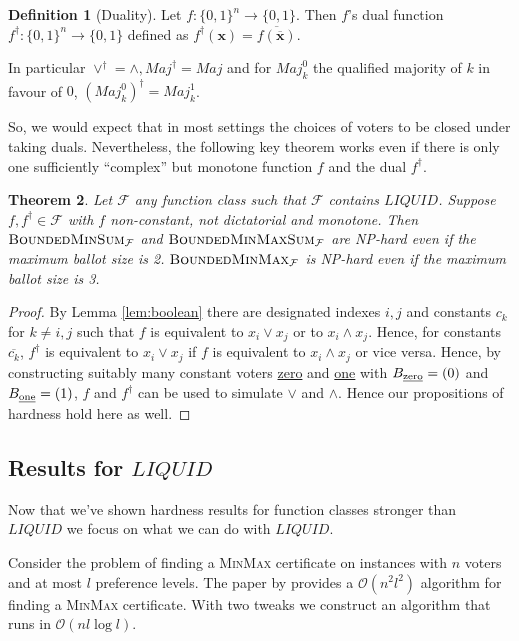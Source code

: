 \documentclass[11pt,a4paper, titlepage]{article}
\newtheorem{theorem}{Theorem}
\theoremstyle{definition}
\newtheorem{definition}[theorem]{Definition}
\let\vec\mathbf
\newcommand{\BMM}{\textsc{BoundedMinMax}}
\newcommand{\BMS}{\textsc{BoundedMinSum}}
\newcommand{\BMMS}{\textsc{BoundedMinMaxSum}}
\newcommand{\Maj}{\mathit{Maj}}
\newcommand{\LIQUID}{\mathit{LIQUID}}
\begin{document}
\begin{definition}[Duality]
    Let $f \colon \{0, 1\}^n \longrightarrow \{0, 1\}$. Then $f$'s dual function $f^\dagger \colon \{0, 1\}^n \longrightarrow \{0, 1\}$ defined as $f^\dagger(\vec{x}) = \overline{f(\overline{\vec{x}})}$.
\end{definition}

In particular $\lor^\dagger = \land,\Maj^\dagger= \Maj$ and for $\Maj_k^0$ the qualified majority of $k$ in favour of $0$, $(\Maj_k^0)^\dagger = \Maj_k^1$.

So, we would expect that in most settings the choices of voters to be closed under taking duals.
Nevertheless, the following key theorem works even if there is only one sufficiently ``complex'' but monotone function $f$ and the dual $f^\dagger$.

\begin{theorem}
    Let $\mathcal{F}$ any function class such that $\mathcal{F}$ contains $\LIQUID$. Suppose $f, f^\dagger \in \mathcal{F}$ with $f$ non-constant, not dictatorial and monotone.
    Then $\BMS_\mathcal{F}$ and $\BMMS_\mathcal{F}$ are NP-hard even if the maximum ballot size is 2. $\BMM_{\mathcal{F}}$ is NP-hard even if the maximum ballot size is 3.
\end{theorem}

\begin{proof}
    By Lemma \ref{lem:boolean} there are designated indexes $i, j$ and constants $c_k$ for $k \neq i, j$ such that $f$ is equivalent to $x_i \lor x_j$ or to $x_i \land x_j$.
    Hence, for constants $\overline{c_k}$, $f^\dagger$ is equivalent to $x_i \lor x_j$ if $f$ is equivalent to $x_i \land x_j$ or vice versa.
    Hence, by constructing suitably many constant voters \underline{zero} and \underline{one} with $B_{\text{\underline{zero}}} = (0)$ and $B_{\text{\underline{one}}} = (1)$, $f$ and $f^\dagger$ can be used to simulate $\lor$ and $\land$.
    Hence our propositions of hardness hold here as well.
\end{proof}

\subsection{Results for $\LIQUID$}

Now that we've shown hardness results for function classes stronger than $\LIQUID$ we focus on what we can do with $\LIQUID$.

Consider the problem of finding a \textsc{MinMax} certificate on instances with $n$ voters and at most $l$ preference levels.
The paper by \citet{grandi} provides a $\mathcal{O}(n^2l^2)$ algorithm for finding a \textsc{MinMax} certificate. With two tweaks we construct an algorithm that runs in $\mathcal{O}(nl \log l)$.
\end{document}
